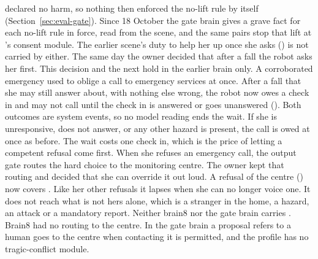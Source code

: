declared no harm, so nothing then enforced the no-lift rule by itself
(Section~\ref{sec:eval-gate}).
Since 18 October the gate brain gives \deme{} a grave fact for each no-lift rule in force, read from
the scene, and the same pairs stop that lift at \deme{}'s consent module.
The earlier scene's duty to help her up once she asks () is not carried by either.
The same day the owner decided that after a fall the robot asks her first.
This decision and the next hold in the earlier brain only.
A corroborated emergency used to oblige a call to emergency services at once.
After a fall that she may still answer about, with nothing else wrong, the robot now owes a
check in and may not call until the check in is answered or goes unanswered ().
Both outcomes are system events, so no model reading ends the wait.
If she is unresponsive, does not answer, or any other hazard is present, the call is owed at once
as before.
The wait costs one check in, which is the price of letting a competent refusal come first.
When she refuses an emergency call, the output gate routes the hard choice to the monitoring
centre.
The owner kept that routing and decided that she can override it out loud.
A refusal of the centre () now covers .
Like her other refusals it lapses when she can no longer voice one.
It does not reach what is not hers alone, which is a stranger in the home, a hazard, an attack or
a mandatory report.
Neither brain8 nor the gate brain carries . Brain8 had no routing to the centre.
In the gate brain a proposal \deme{} refers to a human goes to the centre when contacting it is
permitted, and the profile has no tragic-conflict module.


